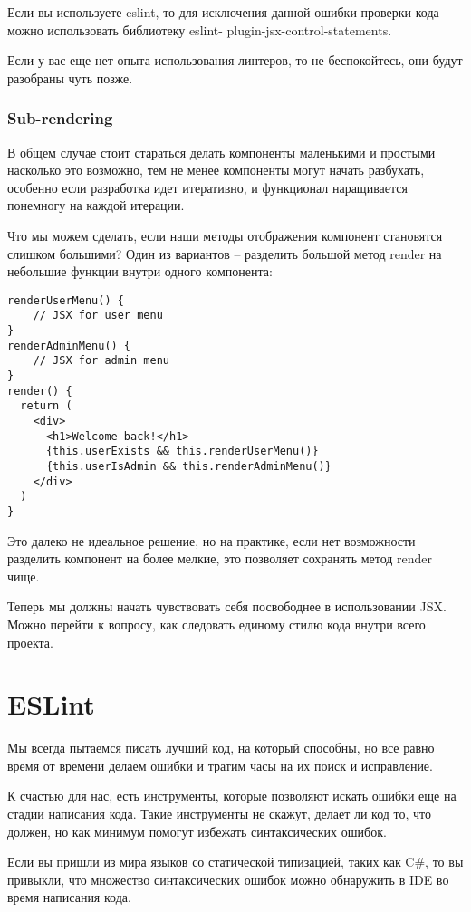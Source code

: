 Если вы используете eslint, то для исключения данной ошибки проверки кода можно использовать библиотеку eslint- plugin-jsx-control-statements.

Если у вас еще нет опыта использования линтеров, то не беспокойтесь, они будут разобраны чуть позже. 

\subsubsection{Sub-rendering}

В общем случае стоит стараться делать компоненты маленькими и простыми насколько это возможно, тем не менее компоненты могут начать разбухать, особенно если разработка идет итеративно, и функционал наращивается понемногу на каждой итерации.

Что мы можем сделать, если наши методы отображения компонент становятся слишком большими? Один из вариантов -- разделить большой метод render на небольшие функции внутри одного компонента:

\begin{lstlisting}
renderUserMenu() {
    // JSX for user menu
}
renderAdminMenu() {
    // JSX for admin menu
}
render() {
  return (
    <div>
      <h1>Welcome back!</h1>
      {this.userExists && this.renderUserMenu()}
      {this.userIsAdmin && this.renderAdminMenu()}
    </div> 
  )
}
\end{lstlisting}

Это далеко не идеальное решение, но на практике, если нет возможности разделить компонент на более мелкие, это позволяет сохранять метод render чище.

Теперь мы должны начать чувствовать себя посвободнее в использовании JSX. Можно перейти к вопросу, как следовать единому стилю кода внутри всего проекта.

\section{ESLint}

Мы всегда пытаемся писать лучший код, на который способны, но все равно время от времени делаем ошибки и тратим часы на их поиск и исправление.

К счастью для нас, есть инструменты, которые позволяют искать ошибки еще на стадии написания кода. Такие инструменты не скажут, делает ли код то, что должен, но как минимум помогут избежать синтаксических ошибок.

Если вы пришли из мира языков со статической типизацией, таких как C\#, то вы привыкли, что множество синтаксических ошибок можно обнаружить в IDE во время написания кода.

